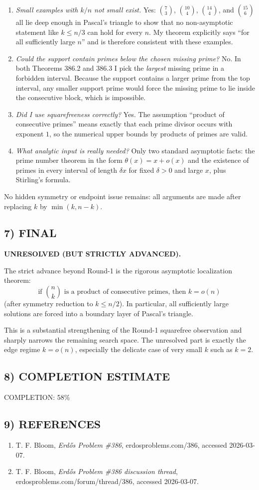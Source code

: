 \begin{enumerate}
\item \emph{Small examples with $k/n$ not small exist.} Yes: $\binom{7}{3}$, $\binom{10}{4}$, $\binom{14}{4}$, and $\binom{15}{6}$ all lie deep enough in Pascal's triangle to show that no non-asymptotic statement like $k\leq n/3$ can hold for every $n$. My theorem explicitly says ``for all sufficiently large $n$'' and is therefore consistent with these examples.
\item \emph{Could the support contain primes below the chosen missing prime?} No. In both Theorems 386.2 and 386.3 I pick the \emph{largest} missing prime in a forbidden interval. Because the support contains a larger prime from the top interval, any smaller support prime would force the missing prime to lie inside the consecutive block, which is impossible.
\item \emph{Did I use squarefreeness correctly?} Yes. The assumption ``product of consecutive primes'' means exactly that each prime divisor occurs with exponent $1$, so the numerical upper bounds by products of primes are valid.
\item \emph{What analytic input is really needed?} Only two standard asymptotic facts: the prime number theorem in the form $\theta(x)=x+o(x)$ and the existence of primes in every interval of length $\delta x$ for fixed $\delta>0$ and large $x$, plus Stirling's formula.
\end{enumerate}

No hidden symmetry or endpoint issue remains: all arguments are made after replacing $k$ by $\min(k,n-k)$.

\subsection*{7) FINAL}
\textbf{UNRESOLVED (BUT STRICTLY ADVANCED).}

The strict advance beyond Round-1 is the rigorous asymptotic localization theorem:
\[
\text{if } \binom{n}{k}\text{ is a product of consecutive primes, then } k=o(n)
\]
(after symmetry reduction to $k\leq n/2$). In particular, all sufficiently large solutions are forced into a boundary layer of Pascal's triangle.

This is a substantial strengthening of the Round-1 squarefree observation and sharply narrows the remaining search space. The unresolved part is exactly the edge regime $k=o(n)$, especially the delicate case of very small $k$ such as $k=2$.

\subsection*{8) COMPLETION ESTIMATE}
COMPLETION: 58\%

\subsection*{9) REFERENCES}
\begin{enumerate}
\item T. F. Bloom, \emph{Erd\H{o}s Problem \#386}, erdosproblems.com/386, accessed 2026-03-07.
\item T. F. Bloom, \emph{Erd\H{o}s Problem \#386 discussion thread}, erdosproblems.com/forum/thread/386, accessed 2026-03-07.
\end{enumerate}


